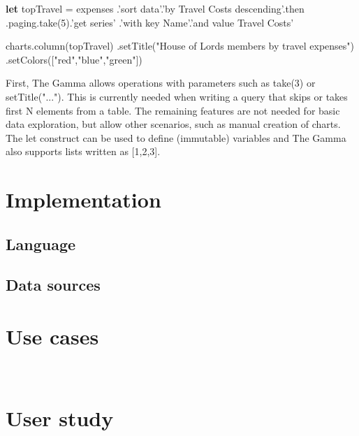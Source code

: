 \documentclass{sigchi}
\newcommand{\kvd}[1]{\textbf{#1}}
\newcommand{\ikvd}[1]{{\fontfamily{zi4}\selectfont\small #1}}
\begin{document}
\begin{thegamma}
\kvd{let} topTravel =
  expenses
    .'sort data'.'by Travel Costs descending'.then
    .paging.take(5).'get series'
    .'with key Name'.'and value Travel Costs'

charts.column(topTravel)
  .setTitle("House of Lords members by travel expenses")
  .setColors(["red","blue","green"])
\end{thegamma}

First, The Gamma allows operations with parameters such as \ikvd{take(3)} or \ikvd{setTitle("...")}.
This is currently needed when writing a query that skips or takes first N elements from a table.
The remaining features are not needed for basic data exploration, but allow other scenarios, such
as manual creation of charts. The \ikvd{let} construct can be used to define (immutable) variables
and The Gamma also supports lists written as \ikvd{[1,2,3]}.


\section{Implementation}
\label{sec:implementation}

\subsection{Language}

\subsection{Data sources}


\section{Use cases}
\label{sec:cases}

\newpage
~
\newpage


\section{User study}
\label{sec:study}
\end{document}
